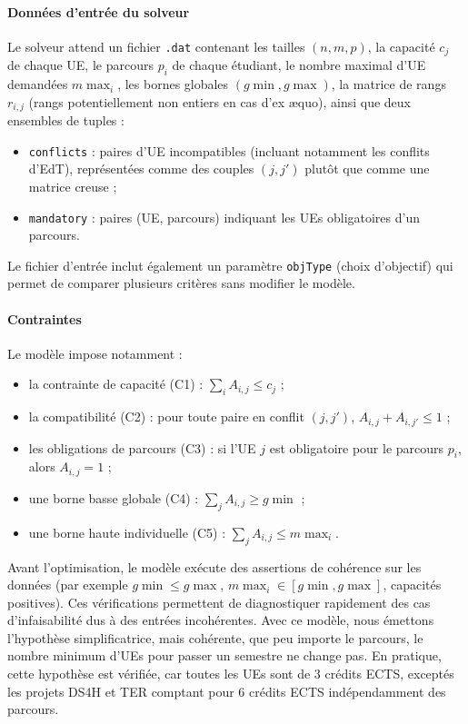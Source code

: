 \documentclass{rapport}
\theoremstyle{definition}
\theoremstyle{remark}
\theoremstyle{plain}
\theoremstyle{definition}
\theoremstyle{definition}
\theoremstyle{remark}
\theoremstyle{definition}
\begin{document}
\paragraph{Données d'entrée du solveur}
Le solveur attend un fichier \texttt{.dat} contenant les tailles $(n,m,p)$, la capacité $c_j$ de chaque UE, le parcours $p_i$ de chaque étudiant, le nombre maximal d'UE demandées $m\!\max_i$, les bornes globales $(g\!\min,g\!\max)$, la matrice de rangs $r_{i,j}$ (rangs potentiellement non entiers en cas d'ex æquo), ainsi que deux ensembles de tuples :
\begin{itemize}
    \item \texttt{conflicts} : paires d'UE incompatibles (incluant notamment les conflits d'EdT), représentées comme des couples $(j,j')$ plutôt que comme une matrice creuse ;
    \item \texttt{mandatory} : paires (UE, parcours) indiquant les UEs obligatoires d'un parcours.
\end{itemize}

Le fichier d'entrée inclut également un paramètre \texttt{objType} (choix d'objectif) qui permet de comparer plusieurs critères sans modifier le modèle.

\paragraph{Contraintes}
Le modèle impose notamment :
\begin{itemize}
    \item la contrainte de capacité (C1) : $\sum_i A_{i,j} \le c_j$ ;
    \item la compatibilité (C2) : pour toute paire en conflit $(j,j')$, $A_{i,j}+A_{i,j'} \le 1$ ;
    \item les obligations de parcours (C3) : si l'UE $j$ est obligatoire pour le parcours $p_i$, alors $A_{i,j}=1$ ;
    \item une borne basse globale (C4) : $\sum_j A_{i,j} \ge g\!\min$ ;
    \item une borne haute individuelle (C5) : $\sum_j A_{i,j} \le m\!\max_i$.
\end{itemize}

Avant l'optimisation, le modèle exécute des assertions de cohérence sur les données (par exemple $g\!\min\le g\!\max$, $m\!\max_i\in[g\!\min,g\!\max]$, capacités positives). Ces vérifications permettent de diagnostiquer rapidement des cas d'infaisabilité dus à des entrées incohérentes.
Avec ce modèle, nous émettons l'hypothèse simplificatrice, mais cohérente, que peu importe le parcours, le nombre minimum d'UEs pour passer un semestre ne change pas. En pratique, cette hypothèse est vérifiée, car toutes les UEs sont de 3 crédits ECTS, exceptés les projets DS4H et TER comptant pour 6 crédits ECTS indépendamment des parcours.
\end{document}
